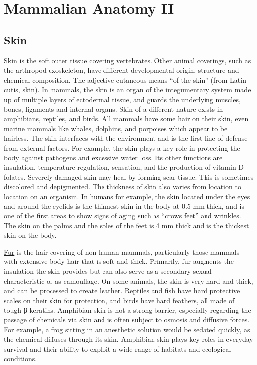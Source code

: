 \chapter{Mammalian Anatomy II}\label{mammalian-anatomy-ii}

\section{Skin}\label{skin}

\href{https://en.wikipedia.org/wiki/Skin}{Skin} is the soft outer tissue
covering vertebrates. Other animal coverings, such as the arthropod
exoskeleton, have different developmental origin, structure and chemical
composition. The adjective cutaneous means ``of the skin'' (from Latin
cutis, skin). In mammals, the skin is an organ of the integumentary
system made up of multiple layers of ectodermal tissue, and guards the
underlying muscles, bones, ligaments and internal organs. Skin of a
different nature exists in amphibians, reptiles, and birds. All mammals
have some hair on their skin, even marine mammals like whales, dolphins,
and porpoises which appear to be hairless. The skin interfaces with the
environment and is the first line of defense from external factors. For
example, the skin plays a key role in protecting the body against
pathogens and excessive water loss. Its other functions are insulation,
temperature regulation, sensation, and the production of vitamin D
folates. Severely damaged skin may heal by forming scar tissue. This is
sometimes discolored and depigmented. The thickness of skin also varies
from location to location on an organism. In humans for example, the
skin located under the eyes and around the eyelids is the thinnest skin
in the body at 0.5 mm thick, and is one of the first areas to show signs
of aging such as ``crows feet'' and wrinkles. The skin on the palms and
the soles of the feet is 4 mm thick and is the thickest skin on the
body.

\href{https://en.wikipedia.org/wiki/Fur}{Fur} is the hair covering of
non-human mammals, particularly those mammals with extensive body hair
that is soft and thick. Primarily, fur augments the insulation the skin
provides but can also serve as a secondary sexual characteristic or as
camouflage. On some animals, the skin is very hard and thick, and can be
processed to create leather. Reptiles and fish have hard protective
scales on their skin for protection, and birds have hard feathers, all
made of tough β-keratins. Amphibian skin is not a strong barrier,
especially regarding the passage of chemicals via skin and is often
subject to osmosis and diffusive forces. For example, a frog sitting in
an anesthetic solution would be sedated quickly, as the chemical
diffuses through its skin. Amphibian skin plays key roles in everyday
survival and their ability to exploit a wide range of habitats and
ecological conditions.

